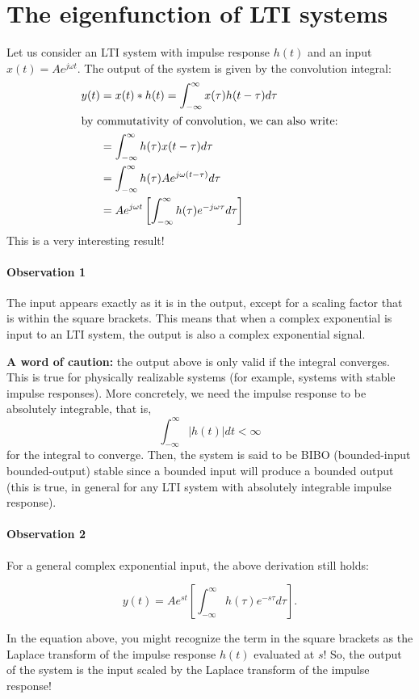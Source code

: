 \documentclass{ee102_notes}
\begin{document}
\section{The eigenfunction of LTI systems}
Let us consider an LTI system with impulse response \(h(t)\) and an input $x(t) = Ae^{j\omega t}$. The output of the system is given by the convolution integral:
\begin{align*}
y(t) &= x(t) * h(t) = \int_{-\infty}^{\infty} x(\tau) h(t - \tau) d\tau \\
\intertext{by commutativity of convolution, we can also write:}
&= \int_{-\infty}^{\infty} h(\tau) x(t - \tau) d\tau \\
&= \int_{-\infty}^{\infty} h(\tau) A e^{j\omega (t - \tau)} d\tau \\
&= A e^{j\omega t} \left[\int_{-\infty}^{\infty} h(\tau) e^{-j\omega \tau} d\tau\right]
\end{align*}
This is a very interesting result! 

\paragraph{Observation 1} The input appears exactly as it is in the output, except for a scaling factor that is within the square brackets. This means that when a complex exponential is input to an LTI system, the output is also a complex exponential signal. 

\textbf{A word of caution:} the output above is only valid if the integral converges. This is true for physically realizable systems (for example, systems with stable impulse responses). More concretely, we need the impulse response to be absolutely integrable, that is, 
\[\int_{-\infty}^{\infty} |h(t)| dt < \infty\] for the integral to converge. Then, the system is said to be BIBO (bounded-input bounded-output) stable since a bounded input will produce a bounded output (this is true, in general for any LTI system with absolutely integrable impulse response).

\paragraph{Observation 2} For a general complex exponential input, the above derivation still holds:

\[
y(t) = A e^{st} \left[\int_{-\infty}^{\infty} h(\tau) e^{-s \tau} d\tau\right].
\]

In the equation above, you might recognize the term in the square brackets as the Laplace transform of the impulse response \(h(t)\) evaluated at \(s\)! So, the output of the system is the input scaled by the Laplace transform of the impulse response!
\end{document}
